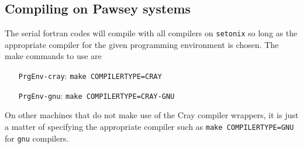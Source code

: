 \subsection{Compiling on Pawsey systems}
The serial fortran codes will compile with all compilers on \texttt{setonix} so long as the appropriate compiler for the given programming environment is chosen. The make commands to use are 
\begin{itemize}
    \setlength{\itemindent}{70pt}
    \item[\texttt{PrgEnv-cray}:\quad]{\texttt{make COMPILERTYPE=CRAY}}
    \item[\texttt{PrgEnv-gnu}:\quad]{\texttt{make COMPILERTYPE=CRAY-GNU}}
\end{itemize}
On other machines that do not make use of the Cray compiler wrappers, it is just a matter of specifying the appropriate compiler such as \texttt{make COMPILERTYPE=GNU} for \texttt{gnu} compilers.
